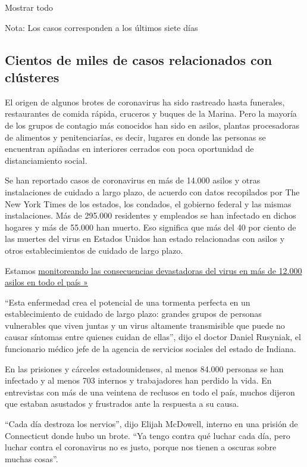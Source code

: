 Mostrar todo

Nota: Los casos corresponden a los últimos siete días

\hypertarget{cientos-de-miles-de-casos-relacionados-con-cluxfasteres}{%
\subsection{Cientos de miles de casos relacionados con
clústeres}\label{cientos-de-miles-de-casos-relacionados-con-cluxfasteres}}

El origen de algunos brotes de coronavirus ha sido rastreado hasta
funerales, restaurantes de comida rápida, cruceros y buques de la
Marina. Pero la mayoría de los grupos de contagio más conocidos han sido
en asilos, plantas procesadoras de alimentos y penitenciarías, es decir,
lugares en donde las personas se encuentran apiñadas en interiores
cerrados con poca oportunidad de distanciamiento social.

Se han reportado casos de coronavirus en más de 14.000 asilos y otras
instalaciones de cuidado a largo plazo, de acuerdo con datos recopilados
por The New York Times de los estados, los condados, el gobierno federal
y las mismas instalaciones. Más de 295.000 residentes y empleados se han
infectado en dichos hogares y más de 55.000 han muerto. Eso significa
que más del 40 por ciento de las muertes del virus en Estados Unidos han
estado relacionadas con asilos y otros establecimientos de cuidado de
largo plazo.

Estamos
\href{https://www.nytimes3xbfgragh.onion/interactive/2020/us/coronavirus-nursing-homes.html}{monitoreando
las consecuencias devastadoras del virus en más de 12.000 asilos en todo
el país »}

``Esta enfermedad crea el potencial de una tormenta perfecta en un
establecimiento de cuidado de largo plazo: grandes grupos de personas
vulnerables que viven juntas y un virus altamente transmisible que puede
no causar síntomas entre quienes cuidan de ellas'', dijo el doctor
Daniel Rusyniak, el funcionario médico jefe de la agencia de servicios
sociales del estado de Indiana.

En las prisiones y cárceles estadounidenses, al menos 84.000 personas se
han infectado y al menos 703 internos y trabajadores han perdido la
vida. En entrevistas con más de una veintena de reclusos en todo el
país, muchos dijeron que estaban asustados y frustrados ante la
respuesta a su causa.

``Cada día destroza los nervios'', dijo Elijah McDowell, interno en una
prisión de Connecticut donde hubo un brote. ``Ya tengo contra qué luchar
cada día, pero luchar contra el coronavirus no es justo, porque nos
tienen a oscuras sobre muchas cosas''.

